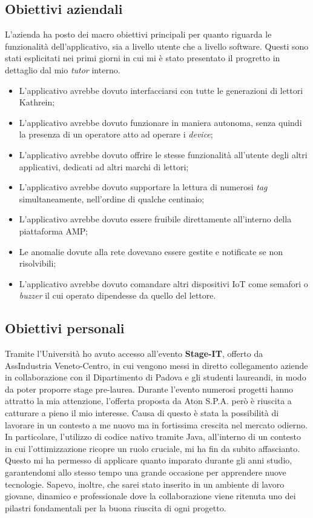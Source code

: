 \subsection{Obiettivi aziendali}
L'azienda ha posto dei macro obiettivi principali per quanto riguarda le funzionalità dell'applicativo, sia a livello utente che a livello software. Questi sono stati
esplicitati nei primi giorni in cui mi è stato presentato il progretto in dettaglio dal mio \emph{tutor} interno.
\begin{itemize}
    \item L'applicativo avrebbe dovuto interfacciarsi con tutte le generazioni di lettori Kathrein;
    \item L'applicativo avrebbe dovuto funzionare in maniera autonoma, senza quindi la presenza di un operatore atto ad operare i \emph{device}; 
    \item L'applicativo avrebbe dovuto offrire le stesse funzionalità all'utente degli altri applicativi, dedicati ad altri marchi di lettori;
    \item L'applicativo avrebbe dovuto supportare la lettura di numerosi \emph{tag} simultaneamente, nell'ordine di qualche centinaio;
    \item L'applicativo avrebbe dovuto essere fruibile direttamente all'interno della piattaforma AMP;
    \item Le anomalie dovute alla rete dovevano essere gestite e notificate se non risolvibili;
    \item L'applicativo avrebbe dovuto comandare altri dispositivi IoT come semafori o \emph{buzzer} il cui operato dipendesse da quello del lettore.
\end{itemize}
\subsection{Obiettivi personali}
Tramite l'Università ho avuto accesso all'evento \textbf{Stage-IT}, offerto da AssIndustria Veneto-Centro, in cui vengono messi in diretto collegamento aziende in collaborazione con
il Dipartimento di Padova e gli studenti laureandi, in modo da poter proporre stage pre-laurea.
Durante l'evento numerosi progetti hanno attratto la mia attenzione, l'offerta proposta da Aton S.P.A. però è riuscita a catturare a pieno il mio interesse.
Causa di questo è stata la possibilità di lavorare in un contesto a me nuovo ma in fortissima crescita nel mercato odierno. In particolare, l'utilizzo di codice nativo
tramite Java, all'interno di un contesto in cui l'ottimizzazione ricopre un ruolo cruciale, mi ha fin da subito affascianto. Questo mi ha permesso di
applicare quanto imparato durante gli anni studio, garantendomi allo stesso tempo una grande occasione per apprendere nuove tecnologie.
Sapevo, inoltre, che sarei stato inserito in un ambiente di lavoro giovane, dinamico e professionale dove la collaborazione viene ritenuta uno dei pilastri fondamentali
per la buona riuscita di ogni progetto.

